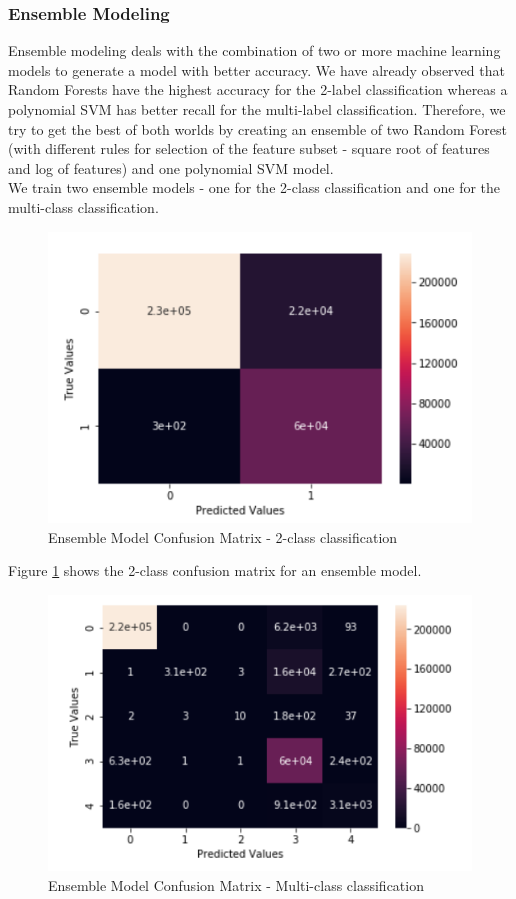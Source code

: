 \subsubsection{Ensemble Modeling}
Ensemble modeling deals with the combination of two or more machine learning models to generate a model with better accuracy. We have already observed that Random Forests have the highest accuracy for the 2-label classification whereas a polynomial SVM has better recall for the multi-label classification. Therefore, we try to get the best of both worlds by creating an ensemble of two Random Forest (with different rules for selection of the feature subset - square root of features and log of features) and one polynomial SVM model.\\
We train two ensemble models - one for the 2-class classification and one for the multi-class classification. 
\begin{figure}
	\includegraphics[width=1.0\columnwidth]{images/ensemble2.PNG}
	\caption{Ensemble Model Confusion Matrix - 2-class classification}
	\label{F:en2}
\end{figure}
Figure \ref{F:en2} shows the 2-class confusion matrix for an ensemble model.
\begin{figure}
	\includegraphics[width=1.0\columnwidth]{images/ensembleall.PNG}
	\caption{Ensemble Model Confusion Matrix - Multi-class classification}
	\label{F:enall}
\end{figure}
